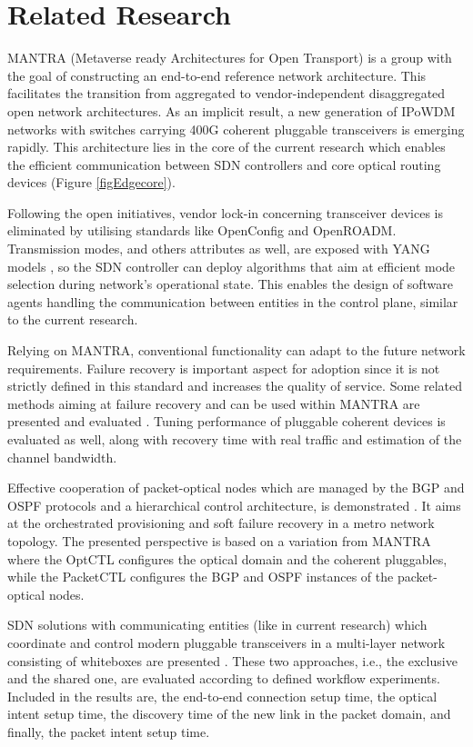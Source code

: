 \section{Related Research\label{lab:related}
}

MANTRA (Metaverse ready Architectures for Open Transport) is a group \cite{de2022mantra} with the goal of constructing an end-to-end reference network architecture. This facilitates the transition from aggregated to vendor-independent disaggregated open network architectures. As an implicit result, a new generation of IPoWDM networks with switches carrying 400G coherent pluggable transceivers is emerging rapidly. This architecture lies in the core of the current research which enables the efficient communication between SDN controllers and core optical routing devices (Figure \ref{figEdgecore}).

Following the open initiatives, vendor lock-in concerning transceiver devices is eliminated \cite{sgambelluri2020openconfig} by utilising standards like OpenConfig and OpenROADM. Transmission modes, and others attributes as well, are exposed with YANG models \cite{szyrkowiec2017optical}, so the SDN controller can deploy algorithms that aim at efficient mode selection during network's operational state. This enables the design of software agents handling the communication between entities in the control plane, similar to the current research.

Relying on MANTRA, conventional functionality can adapt to the future network requirements. Failure recovery is important aspect for adoption since it is not strictly defined in this standard and increases the quality of service. Some related methods aiming at failure recovery and can be used within MANTRA are presented and evaluated \cite{sgambelluri2024failure}. Tuning performance of pluggable coherent devices is evaluated as well, along with recovery time with real traffic and estimation of the channel bandwidth.

Effective cooperation of packet-optical nodes which are managed by the BGP and OSPF protocols and a hierarchical control architecture, is demonstrated \cite{scano2023hybrid}. It aims at the orchestrated provisioning and soft failure recovery in a metro network topology. The presented perspective is based on a variation from MANTRA where the OptCTL configures the optical domain and the coherent pluggables, while the PacketCTL configures the BGP and OSPF instances of the packet-optical nodes.

SDN solutions with communicating entities (like in current research) which coordinate and control modern pluggable transceivers in a multi-layer network consisting of whiteboxes are presented \cite{giorgetti2023enabling}. These two approaches, i.e., the exclusive and the shared one, are evaluated according to defined workflow experiments. Included in the results are, the end-to-end connection setup time, the optical intent setup time, the discovery time of the new link in the packet domain, and finally, the packet intent setup time.